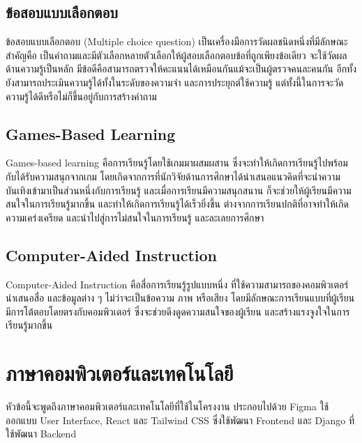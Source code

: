 \documentclass[12pt,oneside,openright,a4paper]{cpe-thai-project}
\begin{document}
\subsection{ข้อสอบแบบเลือกตอบ}

\hspace{1cm}
ข้อสอบแบบเลือกตอบ (Multiple choice question) \cite{MultiChoices} เป็นเครื่องมือการวัดผลชนิดหนึ่งที่มีลักษณะสำคัญคือ
เป็นคำถามและมีตัวเลือกหลายตัวเลือกให้ผู้สอบเลือกตอบข้อที่ถูกเพียงข้อเดียว จะใช้วัดผลด้านความรู้เป็นหลัก
มีข้อดีคือสามารถตรวจให้คะแนนได้เหมือนกันแม้จะเป็นผู้ตรวจคนละคนกัน อีกทั้งยังสามารถประเมินความรู้ได้ทั้งในระดับของความจำ
และการประยุกต์ใช้ความรู้ แต่ทั้งนี้ในการจะวัดความรู้ได้ดีหรือไม่ก็ขึ้นอยู่กับการสร้างคำถาม

\subsection{Games-Based Learning}

\hspace{1cm}
Games-based learning \cite{GBL} คือการเรียนรู้โดยใช้เกมมาผสมผสาน ซึ่งจะทำให้เกิดการเรียนรู้ไปพร้อมกับได้รับความสนุกจากเกม
โดยเกิดจากการที่นักวิจัยด้านการศึกษาได้นำเสนอแนวคิดที่จะนำความบันเทิงเข้ามาเป็นส่วนหนึ่งกับการเรียนรู้ และเมื่อการเรียนมีความสนุกสนาน
ก็จะช่วยให้ผู้เรียนมีความสนใจในการเรียนรู้มากขึ้น และทำให้เกิดการเรียนรู้ได้เร็วยิ่งขึ้น ต่างจากการเรียนปกติที่อาจทำให้เกิดความเคร่งเครียด
และนำไปสู่การไม่สนใจในการเรียนรู้ และละเลยการศึกษา

\subsection{Computer-Aided Instruction}

\hspace{1cm}
Computer-Aided Instruction \cite{CAI1,CAI2} คือสื่อการเรียนรู้รูปแบบหนึ่ง ที่ใช้ความสามารถของคอมพิวเตอร์นำเสนอสื่อ และข้อมูลต่าง ๆ
ไม่ว่าจะเป็นข้อความ ภาพ หรือเสียง โดยมีลักษณะการเรียนแบบที่ผู้เรียนมีการโต้ตอบโดยตรงกับคอมพิวเตอร์
ซึ่งจะช่วยดึงดูดความสนใจของผู้เรียน และสร้างแรงจูงใจในการเรียนรู้มากขึ้น


\section{ภาษาคอมพิวเตอร์และเทคโนโลยี}

\hspace{1cm}
หัวข้อนี้จะพูดถึงภาษาคอมพิวเตอร์และเทคโนโลยีที่ใช้ในโครงงาน ประกอบไปด้วย Figma ใช้ออกแบบ User Interface,
React
และ Tailwind CSS
ซึ่งใช้พัฒนา Frontend และ Django ที่ใช้พัฒนา Backend
\end{document}
